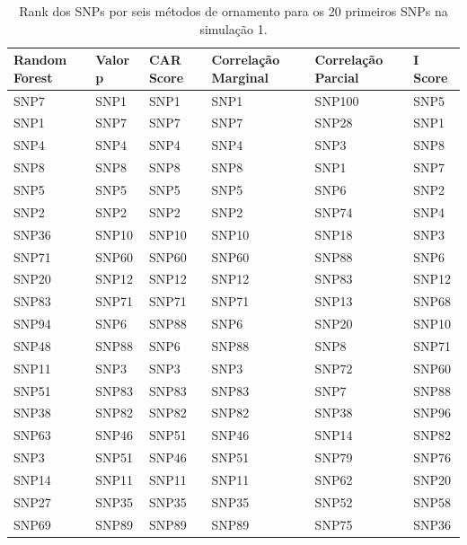 \begin{table}[ht]
\centering
\begin{tabular}{llllll}
  \hline
Random Forest & Valor p & CAR Score & Correlação Marginal & Correlação Parcial & I Score \\ 
  \hline
SNP7 & SNP1 & SNP1 & SNP1 & SNP100 & SNP5 \\ 
  SNP1 & SNP7 & SNP7 & SNP7 & SNP28 & SNP1 \\ 
  SNP4 & SNP4 & SNP4 & SNP4 & SNP3 & SNP8 \\ 
  SNP8 & SNP8 & SNP8 & SNP8 & SNP1 & SNP7 \\ 
  SNP5 & SNP5 & SNP5 & SNP5 & SNP6 & SNP2 \\ 
  SNP2 & SNP2 & SNP2 & SNP2 & SNP74 & SNP4 \\ 
  SNP36 & SNP10 & SNP10 & SNP10 & SNP18 & SNP3 \\ 
  SNP71 & SNP60 & SNP60 & SNP60 & SNP88 & SNP6 \\ 
  SNP20 & SNP12 & SNP12 & SNP12 & SNP83 & SNP12 \\ 
  SNP83 & SNP71 & SNP71 & SNP71 & SNP13 & SNP68 \\ 
  SNP94 & SNP6 & SNP88 & SNP6 & SNP20 & SNP10 \\ 
  SNP48 & SNP88 & SNP6 & SNP88 & SNP8 & SNP71 \\ 
  SNP11 & SNP3 & SNP3 & SNP3 & SNP72 & SNP60 \\ 
  SNP51 & SNP83 & SNP83 & SNP83 & SNP7 & SNP88 \\ 
  SNP38 & SNP82 & SNP82 & SNP82 & SNP38 & SNP96 \\ 
  SNP63 & SNP46 & SNP51 & SNP46 & SNP14 & SNP82 \\ 
  SNP3 & SNP51 & SNP46 & SNP51 & SNP79 & SNP76 \\ 
  SNP14 & SNP11 & SNP11 & SNP11 & SNP62 & SNP20 \\ 
  SNP27 & SNP35 & SNP35 & SNP35 & SNP52 & SNP58 \\ 
  SNP69 & SNP89 & SNP89 & SNP89 & SNP75 & SNP36 \\ 
   \hline
\end{tabular}
\caption{Rank dos SNPs por seis métodos de ornamento para os 20 primeiros SNPs na simulação 1.} 
\label{tab:ranks}
\end{table}
